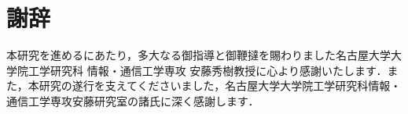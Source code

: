 
\chapter*{謝辞}
本研究を進めるにあたり，多大なる御指導と御鞭撻を賜わりました名古屋大学大学院工学研究科 情報・通信工学専攻 安藤秀樹教授に心より感謝いたします．また，本研究の遂行を支えてくださいました，名古屋大学大学院工学研究科情報・通信工学専攻安藤研究室の諸氏に深く感謝します．
